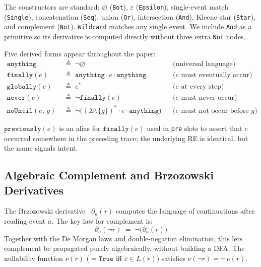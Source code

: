 \documentclass[acmsmall,screen]{acmart}
\newcommand{\anything}{\mathtt{anything}}
\newcommand{\finally}[1]{\mathtt{finally}(#1)}
\newcommand{\previously}[1]{\mathtt{previously}(#1)}
\newcommand{\never}[1]{\mathtt{never}(#1)}
\newcommand{\noUntil}[2]{\mathtt{noUntil}(#1,\,#2)}
\begin{document}
\noindent
The constructors are standard: $\varnothing$ (\lstinline{Bot}),
$\varepsilon$ (\lstinline{Epsilon}), single-event match
(\lstinline{Single}), concatenation (\lstinline{Seq}), union
(\lstinline{Or}), intersection (\lstinline{And}), Kleene star
(\lstinline{Star}), and complement (\lstinline{Not}).
\lstinline{Wildcard} matches any single event.
We include \lstinline{And} as a primitive so its derivative is computed
directly without three extra \lstinline{Not} nodes.

Five derived forms appear throughout the paper:
\begin{align*}
  \anything &\;\triangleq\; \neg\varnothing
            &&\text{(universal language)} \\
  \finally{e} &\;\triangleq\; \anything \cdot e \cdot \anything
            &&\text{($e$ must eventually occur)} \\
  \mathtt{globally}(e) &\;\triangleq\; e^*
            &&\text{($e$ at every step)} \\
  \never{e} &\;\triangleq\; \neg\finally{e}
            &&\text{($e$ must never occur)} \\
  \noUntil{e}{g} &\;\triangleq\;
            \neg\bigl((\Sigma\setminus\{g\})^* \cdot e \cdot \anything\bigr)
            &&\text{($e$ must not occur before $g$)}
\end{align*}

\noindent
$\previously{e}$ is an alias for $\finally{e}$ used in \lstinline{pre} slots
to assert that $e$ occurred somewhere in the preceding trace; the underlying
RE is identical, but the name signals intent.

\subsection{Algebraic Complement and Brzozowski Derivatives}
\label{sec:deriv}

The Brzozowski derivative~\cite{brzozowski1964} $\partial_a(r)$ computes
the language of continuations after reading event $a$.
The key law for complement is:
\begin{equation}
  \partial_a(\neg r) \;=\; \neg\bigl(\partial_a(r)\bigr)
  \label{eq:deriv-not}
\end{equation}
Together with the De Morgan laws and double-negation elimination, this lets
complement be propagated purely algebraically, without building a DFA.
The nullability function $\nu(r)$ ($= \mathtt{True}$ iff $\varepsilon \in L(r)$)
satisfies $\nu(\neg r) = \neg\,\nu(r)$.
\end{document}
